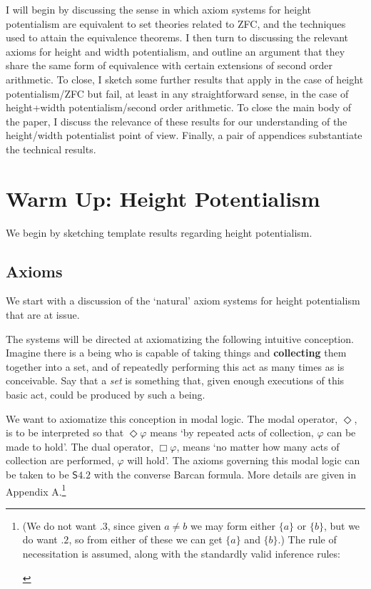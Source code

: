 \documentclass{article}
\begin{document}
I will begin by discussing the sense in which axiom systems for height potentialism
are equivalent to set theories related to ZFC, and the techniques used to attain 
the equivalence theorems. I then turn to discussing the relevant axioms 
for height and width 
potentialism, and outline an argument that they share the same form of equivalence with certain extensions 
of second order arithmetic. To close, I sketch some further results that apply in the 
case of height potentialism/ZFC but fail, at least in any straightforward sense, 
in the case of height+width potentialism/second order arithmetic. 
To close the main body of the paper, I discuss the relevance of these results for our understanding 
of the height/width potentialist point of view.
Finally, a pair of appendices substantiate the technical results.
\section{Warm Up: Height Potentialism}
We begin by sketching template results regarding height potentialism. 
\subsection{Axioms}
We start with a discussion of the `natural' axiom systems for height potentialism 
that are at issue.

The systems will be directed at axiomatizing the following 
intuitive conception. Imagine there is a being who is capable of taking things 
and {\bf collecting} them together into a set, and of repeatedly performing this act 
as many times as is conceivable. Say that a \emph{set} is something that, given enough 
executions of this basic act, could be produced by such a being. 

We want to axiomatize this conception in modal logic. The modal operator, $\Diamond$, 
is to be interpreted so that $\Diamond \varphi$ means
`by repeated acts of collection, $\varphi$ can be made to hold'. The dual 
operator, $\Box \varphi$, means `no matter how many acts of collection are performed, 
$\varphi$ will hold'. The axioms governing this modal logic can be taken to be 
$\mathsf{S4.2}$ with the converse Barcan formula. More details are given in Appendix A.\footnote{(We do not want $.3$, 
since given $a \not= b$ we may form either $\{a\}$ or $\{b\}$, but we do want 
$.2$,
so from either of these we can get $\{a\}$ and $\{b\}$.) The rule of necessitation 
is assumed, along with the standardly valid inference rules:
\begin{prooftree}
\end{prooftree}}
 
\end{document}
